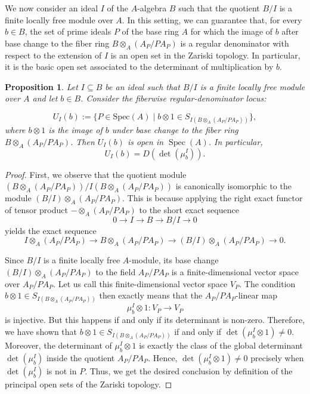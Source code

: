 \documentclass[11pt,leqno]{amsart}
\newtheorem{proposition}[theorem]{Proposition}
\theoremstyle{definition}
\numberwithin{equation}{section}
\DeclareMathOperator{\Spec}{Spec}
\begin{document}
We now consider an ideal $I$ of the $A$-algebra $B$ such that the quotient $B/I$ is a finite locally free module over $A$. In this setting, we can guarantee that, for every $b\in B$, the set of prime ideals $P$ of the base ring $A$ for which the image of $b$ after base change to the fiber ring $B\otimes_A (A_P/PA_P)$ is a regular denominator with respect to the extension of $I$ is an open set in the Zariski topology. In particular, it is the basic open set associated to the determinant of multiplication by $b$.

\begin{proposition}\label{propdet}
Let $I\subseteq B$ be an ideal such that $B/I$ is a finite locally free module over $A$ and let $b\in B$. Consider the fiberwise regular-denominator locus:

$$U_{I}(b):=\{P\in \mathrm{Spec}(A)\mid b\otimes1\in S_{I(B\otimes_A (A_P/PA_P))}\},$$ 
where $b\otimes 1$ is the image of $b$ under base change to the fiber ring $B\otimes_A (A_P/PA_P)$.
Then $U_{I}(b)$ is open in $\Spec(A)$. In particular, 
$$U_{I}(b)=D(\operatorname{det}(\mu_b^I)).$$
\end{proposition}

\begin{proof}
    First, we observe that the quotient module $(B\otimes_A (A_P/PA_P))/I(B\otimes_A (A_P/PA_P))$ is canonically isomorphic to the module 
  $(B/I) \otimes_{A} (A_P/PA_P)$. This is because applying the right exact functor of tensor product  $-\otimes_{A} (A_P/PA_P)$ to the short exact sequence
  $$0 \longrightarrow I \longrightarrow B \longrightarrow B/I \longrightarrow 0$$
  yields the exact sequence
  $$I \otimes_{A} (A_P/PA_P) \longrightarrow B \otimes_{A} (A_P/PA_P) \longrightarrow (B/I) \otimes_{A}  (A_P/PA_P)  \longrightarrow 0.$$
  

Since $B/I$ is a finite locally free $A$-module, its base change $(B/I) \otimes_{A} (A_P/PA_P)$ to the field $A_P/PA_P$ is a finite-dimensional vector space over $A_P/PA_P$. Let us call this finite-dimensional vector space $V_{P}$. The condition $b\otimes 1 \in S_{I(B\otimes_A (A_P/PA_P))}$ then exactly means that the $A_P/PA_P$-linear map 
  $$\mu_{b}^I \otimes 1 \colon V_{P} \longrightarrow V_{P}$$is injective. But this happens if and only if its determinant is non-zero.
  Therefore, we have shown that $b\otimes 1 \in S_{I(B\otimes_A (A_P/PA_P))}$ if and only if  $\det(\mu_{b}^I \otimes 1) \neq 0$. Moreover, the determinant of $\mu_{b}^I \otimes 1$ is exactly the class of the global determinant $\det(\mu_{b}^I)$ inside the quotient $A_P/PA_P$. Hence, $\det(\mu_{b}^I \otimes 1) \neq 0$ precisely when $\det(\mu_{b}^I)$ is not in $P$. Thus, we get the desired conclusion by definition of the principal open sets of the Zariski topology.
\end{proof}
\end{document}
